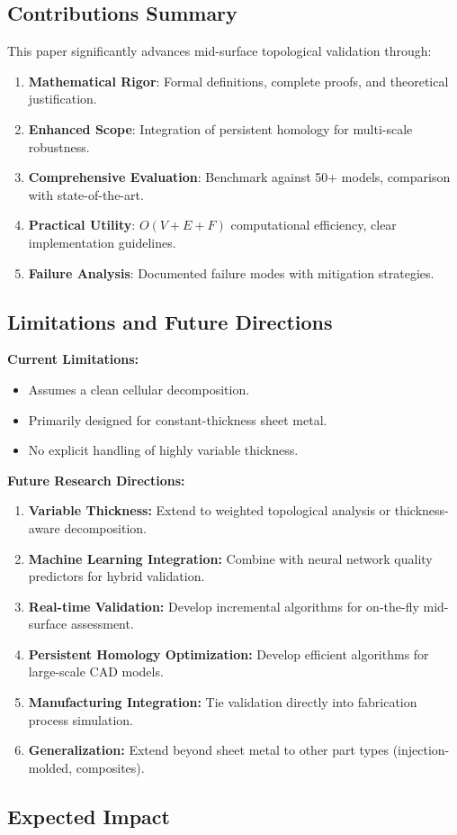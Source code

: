 \documentclass[conference]{IEEEtran}
\begin{document}
\subsection{Contributions Summary}
This paper significantly advances mid-surface topological validation through:
\begin{enumerate}
\item \textbf{Mathematical Rigor}: Formal definitions, complete proofs, and theoretical justification.
\item \textbf{Enhanced Scope}: Integration of persistent homology for multi-scale robustness.
\item \textbf{Comprehensive Evaluation}: Benchmark against 50+ models, comparison with state-of-the-art.
\item \textbf{Practical Utility}: $O(V+E+F)$ computational efficiency, clear implementation guidelines.
\item \textbf{Failure Analysis}: Documented failure modes with mitigation strategies.
\end{enumerate} \subsection{Limitations and Future Directions}
\textbf{Current Limitations:}
\begin{itemize}
\item Assumes a clean cellular decomposition.
\item Primarily designed for constant-thickness sheet metal.
\item No explicit handling of highly variable thickness.
\end{itemize}
\textbf{Future Research Directions:}
\begin{enumerate}
\item \textbf{Variable Thickness:} Extend to weighted topological analysis or thickness-aware decomposition.
\item \textbf{Machine Learning Integration:} Combine with neural network quality predictors for hybrid validation.
\item \textbf{Real-time Validation:} Develop incremental algorithms for on-the-fly mid-surface assessment.
\item \textbf{Persistent Homology Optimization:} Develop efficient algorithms for large-scale CAD models.
\item \textbf{Manufacturing Integration:} Tie validation directly into fabrication process simulation.
\item \textbf{Generalization:} Extend beyond sheet metal to other part types (injection-molded, composites).
\end{enumerate} \subsection{Expected Impact}
\end{document}
